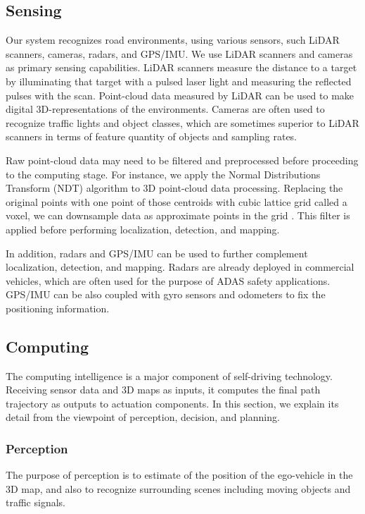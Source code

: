 \subsection{Sensing}
\label{sec:sensing}
Our system recognizes road environments, using various sensors, such
LiDAR scanners, cameras, radars, and GPS/IMU.
We use LiDAR scanners and cameras as primary sensing capabilities.
LiDAR scanners measure the distance to a target by illuminating that
target with a pulsed laser light and measuring the reflected pulses with
the scan.
Point-cloud data measured by LiDAR can be used to make digital
3D-representations of the environments.
Cameras are often used to recognize traffic lights and object classes,
which are sometimes superior to LiDAR scanners in terms of feature
quantity of objects and sampling rates.

Raw point-cloud data may need to be filtered and preprocessed before
proceeding to the computing stage.
For instance, we apply the Normal Distributions Transform (NDT)
algorithm \cite{biber2003normal} to 3D point-cloud data processing. 
Replacing the original points with one point of those centroids with
cubic lattice grid called a voxel, we can downsample data as approximate
points in the grid \cite{magnusson2009three}. 
This filter is applied before performing localization, detection, and
mapping.

In addition, radars and GPS/IMU can be used to further complement
localization, detection, and mapping.
Radars are already deployed in commercial vehicles, which are often used
for the purpose of ADAS safety applications.
GPS/IMU can be also coupled with gyro sensors and odometers to fix the
positioning information.

\subsection{Computing}
\label{sec:computing}

The computing intelligence is a major component of self-driving
technology.
Receiving sensor data and 3D maps as inputs, it computes the final path
trajectory as outputs to actuation components.
In this section, we explain its detail from the viewpoint of perception,
decision, and planning. 

\subsubsection{Perception}
\label{sec:perception}
The purpose of perception is to estimate of the position of the
ego-vehicle in the 3D map, and also to recognize surrounding scenes
including moving objects and traffic signals.

